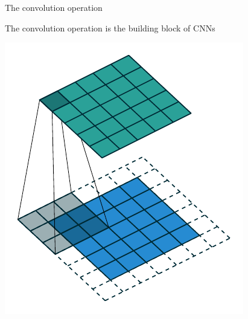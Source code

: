 \begin{frame}{The convolution operation}

  \begin{minipage}{\textwidth}
    \centering
    The convolution operation is the building block of CNNs
  \end{minipage}
  \vspace{0.3cm}

  \begin{minipage}{0.24\textwidth}
    \includegraphics[width=\textwidth]{images/conv_00.pdf}
  \end{minipage}
  \begin{minipage}{0.24\textwidth}

\end{minipage}
\end{frame}
